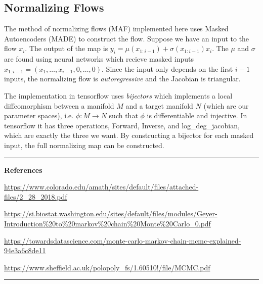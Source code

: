 \subsection{Normalizing Flows}
The method of normalizing flows (MAF) implemented here uses Masked Autoencoders (MADE) to construct the flow. Suppose we have an input to the flow $x_i$. The output of the map is $y_i= \mu(x_{1:i-1})+\sigma(x_{1:i-1})x_i$. The $\mu$ and $\sigma$ are found using neural networks which recieve masked inputs $x_{1:i-1}=(x_1,\ldots,x_{i-1},0,\ldots,0)$. Since the input only depends on the first $i-1$ inputs, the normalizing flow is \textit{autoregressive} and the Jacobian is triangular.

The implementation in tensorflow uses \textit{bijectors} which implements a local diffeomorphism between a manifold $M$ and a target manifold $N$ (which are our parameter spaces), i.e. $\phi:M\rightarrow N$ such that $\phi$ is differentiable and injective. In tensorflow it has three operations, Forward, Inverse, and log\_deg\_jacobian, which are exactly the three we want. By constructing a bijector for each masked input, the full normalizing map can be constructed.

\bigskip
\hrule
\textbf{\large References}

\url{https://www.colorado.edu/amath/sites/default/files/attached-files/2_28_2018.pdf}

\url{https://si.biostat.washington.edu/sites/default/files/modules/Geyer-Introduction\%20to\%20markov\%20chain\%20Monte\%20Carlo_0.pdf}

\url{https://towardsdatascience.com/monte-carlo-markov-chain-mcmc-explained-94e3a6c8de11}

\url{https://www.sheffield.ac.uk/polopoly_fs/1.60510!/file/MCMC.pdf}
\hrule
